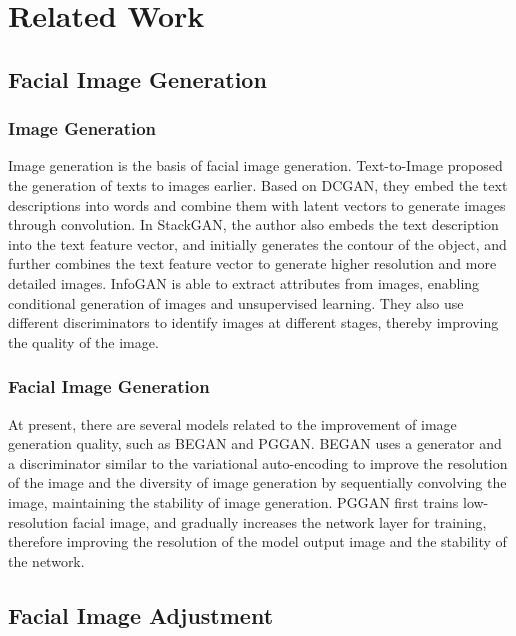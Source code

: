 \section{Related Work}

\subsection{Facial Image Generation}

\subsubsection*{Image Generation}

Image generation is the basis of facial image generation.
Text-to-Image proposed the generation of texts to images earlier.
Based on DCGAN, they embed the text descriptions into words and combine them with latent vectors to generate images through convolution.
In StackGAN, the author also embeds the text description into the text feature vector,
    and initially generates the contour of the object,
    and further combines the text feature vector to generate higher resolution and more detailed images.
    InfoGAN is able to extract attributes from images, enabling conditional generation of images and unsupervised learning.
They also use different discriminators to identify images at different stages, thereby improving the quality of the image.


\subsubsection*{Facial Image Generation}

At present, there are several models related to the improvement of image generation quality,
    such as BEGAN and PGGAN.
BEGAN uses a generator and a discriminator similar to the variational auto-encoding to improve the resolution of the image and the diversity of image generation by sequentially convolving the image,
    maintaining the stability of image generation.
PGGAN first trains low-resolution facial image,
    and gradually increases the network layer for training,
    therefore improving the resolution of the model output image and the stability of the network.



\subsection{Facial Image Adjustment}

